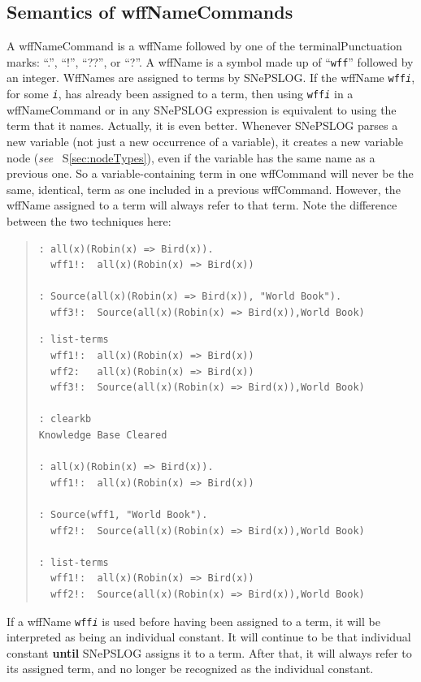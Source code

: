 \documentclass{book}
\begin{document}
\subsection{Semantics of wffNameCommands}
A wffNameCommand is a wffName followed by one of the
terminalPunctuation marks: ``.'', ``!'',
``??'', or ``?''.  A wffName is a symbol made up of ``\texttt{wff}''
followed by an integer.  WffNames are assigned to terms by SNePSLOG.
If the wffName \texttt{wff\textit{i}}, for some \texttt{\textit{i}},
has already been assigned to a term, then using \texttt{wff\textit{i}}
in a wffNameCommand or in any SNePSLOG expression is equivalent to
using the term that it names.  Actually, it is even better.  Whenever
SNePSLOG parses a new variable (not just a new occurrence of a
variable), it creates a new variable node
(\textit{see} ~S\ref{sec:nodeTypes}), even if the variable has the
same name as a previous one.  So a variable-containing term in one
wffCommand will never be the same, identical, term
as one included in a previous wffCommand.  However, the wffName
assigned to a term will always refer to that term.  Note the
difference between the two techniques here:
\begin{quote}
\begin{verbatim}
: all(x)(Robin(x) => Bird(x)).
  wff1!:  all(x)(Robin(x) => Bird(x))    

: Source(all(x)(Robin(x) => Bird(x)), "World Book").
  wff3!:  Source(all(x)(Robin(x) => Bird(x)),World Book)    
\end{verbatim}
\pagebreak
\begin{verbatim}
: list-terms
  wff1!:  all(x)(Robin(x) => Bird(x))    
  wff2:   all(x)(Robin(x) => Bird(x))    
  wff3!:  Source(all(x)(Robin(x) => Bird(x)),World Book)    

: clearkb
Knowledge Base Cleared

: all(x)(Robin(x) => Bird(x)).
  wff1!:  all(x)(Robin(x) => Bird(x))    

: Source(wff1, "World Book").
  wff2!:  Source(all(x)(Robin(x) => Bird(x)),World Book)    

: list-terms
  wff1!:  all(x)(Robin(x) => Bird(x))    
  wff2!:  Source(all(x)(Robin(x) => Bird(x)),World Book)    
\end{verbatim}
\end{quote}

If a wffName \texttt{wff\textit{i}} is used
before having been assigned to a term, it will be interpreted as being
an individual constant.  It will continue to be that individual
constant \textbf{until} SNePSLOG assigns it to a term.  After that, it
will always refer to its assigned term, and no longer be recognized as
the individual constant.
\end{document}
